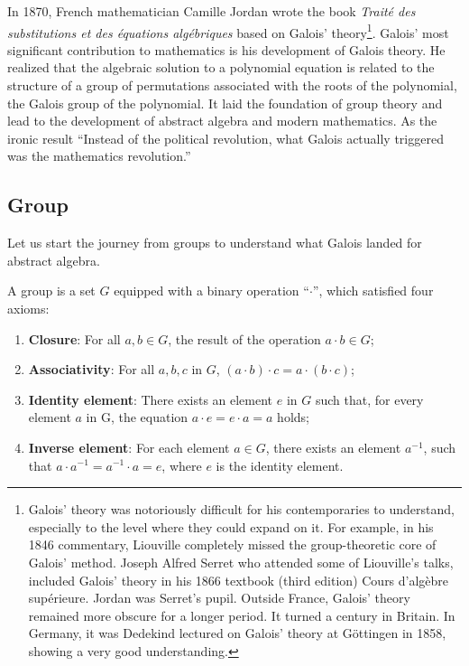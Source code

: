 \documentclass{article}
\begin{document}
In 1870, French mathematician Camille Jordan wrote the book {\em Traité des substitutions et des équations algébriques} based on Galois' theory\footnote{Galois' theory was notoriously difficult for his contemporaries to understand, especially to the level where they could expand on it. For example, in his 1846 commentary, Liouville completely missed the group-theoretic core of Galois' method. Joseph Alfred Serret who attended some of Liouville's talks, included Galois' theory in his 1866 textbook (third edition) Cours d'algèbre supérieure. Jordan was Serret's pupil. Outside France, Galois' theory remained more obscure for a longer period. It turned a century in Britain. In Germany, it was Dedekind lectured on Galois' theory at Göttingen in 1858, showing a very good understanding.}. Galois' most significant contribution to mathematics is his development of Galois theory. He realized that the algebraic solution to a polynomial equation is related to the structure of a group of permutations associated with the roots of the polynomial, the Galois group of the polynomial. It laid the foundation of group theory and lead to the development of abstract algebra and modern mathematics. As the ironic result ``Instead of the political revolution, what Galois actually triggered was the mathematics revolution\cite{StepanovRose15}.''

\subsection{Group}

Let us start the journey from groups to understand what Galois landed for abstract algebra.

\begin{definition} A group is a set $G$ equipped with a binary operation ``$\cdot$'', which satisfied four axioms:

\begin{enumerate}
\item \textbf{Closure}: For all $a, b \in G$, the result of the operation $a \cdot b \in G$;
\item \textbf{Associativity}: For all $a, b, c$ in $G$, $(a \cdot b) \cdot c = a \cdot (b \cdot c)$;
\item \textbf{Identity element}: There exists an element $e$ in $G$ such that, for every element $a$ in G, the equation $a \cdot e = e \cdot a = a$ holds;
\item \textbf{Inverse element}: For each element $a \in G$, there exists an element $a^{-1}$, such that $a \cdot a^{-1} = a^{-1} \cdot a = e$, where $e$ is the identity element.
\end{enumerate}
\end{definition}
\end{document}
